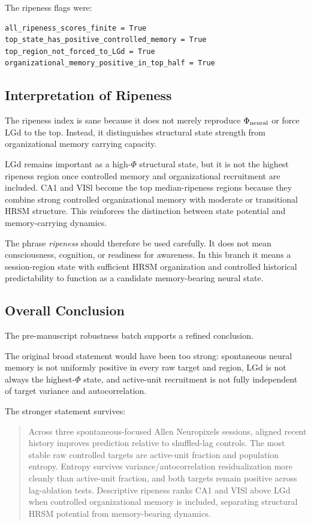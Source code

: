 The ripeness flags were:

\begin{verbatim}
all_ripeness_scores_finite = True
top_state_has_positive_controlled_memory = True
top_region_not_forced_to_LGd = True
organizational_memory_positive_in_top_half = True
\end{verbatim}

\subsection{Interpretation of Ripeness}

The ripeness index is sane because it does not merely reproduce \(\Phi_{\rm neural}\) or force LGd to the top. Instead, it distinguishes structural state strength from organizational memory carrying capacity.

LGd remains important as a high-\(\Phi\) structural state, but it is not the highest ripeness region once controlled memory and organizational recruitment are included. CA1 and VISl become the top median-ripeness regions because they combine strong controlled organizational memory with moderate or transitional HRSM structure. This reinforces the distinction between state potential and memory-carrying dynamics.

The phrase \emph{ripeness} should therefore be used carefully. It does not mean consciousness, cognition, or readiness for awareness. In this branch it means a session-region state with sufficient HRSM organization and controlled historical predictability to function as a candidate memory-bearing neural state.

\subsection{Overall Conclusion}

The pre-manuscript robustness batch supports a refined conclusion.

The original broad statement would have been too strong: spontaneous neural memory is not uniformly positive in every raw target and region, LGd is not always the highest-\(\Phi\) state, and active-unit recruitment is not fully independent of target variance and autocorrelation.

The stronger statement survives:

\begin{quote}
Across three spontaneous-focused Allen Neuropixels sessions, aligned recent history improves prediction relative to shuffled-lag controls. The most stable raw controlled targets are active-unit fraction and population entropy. Entropy survives variance/autocorrelation residualization more cleanly than active-unit fraction, and both targets remain positive across lag-ablation tests. Descriptive ripeness ranks CA1 and VISl above LGd when controlled organizational memory is included, separating structural HRSM potential from memory-bearing dynamics.
\end{quote}

